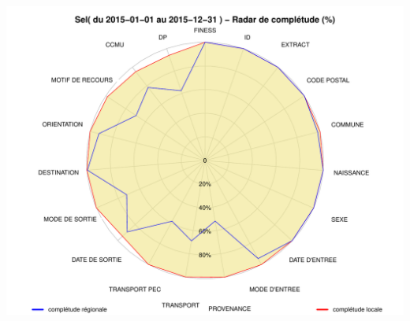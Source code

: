 \documentclass[]{article}
\begin{document}
\includegraphics{completude_files/figure-latex/finess-2.pdf}
\end{document}
